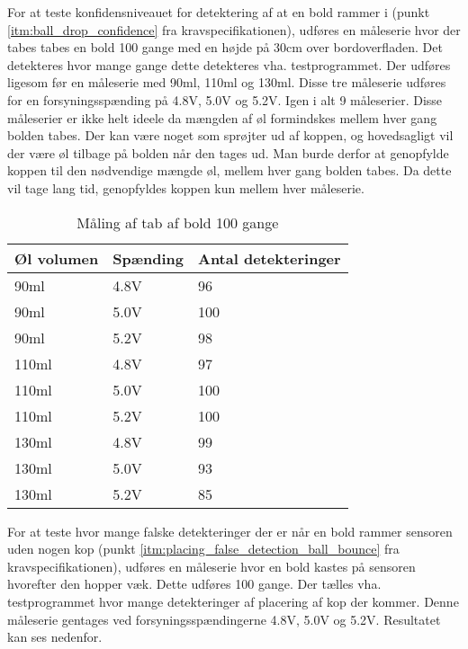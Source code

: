 \documentclass[Modultest/Modultest_main.tex]{subfiles}
\begin{document}
For at teste konfidensniveauet for detektering af at en bold rammer i (punkt \ref{itm:ball_drop_confidence} fra kravspecifikationen), udføres en måleserie hvor der tabes tabes en bold 100 gange med en højde på 30cm over bordoverfladen. Det detekteres hvor mange gange dette detekteres vha. testprogrammet. Der udføres ligesom før en måleserie med 90ml, 110ml og 130ml. Disse tre måleserie udføres for en forsyningsspænding på 4.8V, 5.0V og 5.2V. Igen i alt 9 måleserier. 
Disse måleserier er ikke helt ideele da mængden af øl formindskes mellem hver gang bolden tabes. Der kan være noget som sprøjter ud af koppen, og hovedsagligt vil der være øl tilbage på bolden når den tages ud. Man burde derfor at genopfylde koppen til den nødvendige mængde øl, mellem hver gang bolden tabes. Da dette vil tage lang tid, genopfyldes koppen kun mellem hver måleserie.
\begin{table}[H]
    \centering
    \begin{tabular}{|L{0.15\textwidth}|L{0.15\textwidth}|L{0.2\textwidth}|}
         \hline
         \textbf{Øl volumen} & \textbf{Spænding} & \textbf{Antal detekteringer} \\ \hline
         90ml & 4.8V & 96 \\ \hline 
         90ml & 5.0V & 100 \\ \hline 
         90ml & 5.2V & 98 \\ \hline
         110ml & 4.8V & 97\\ \hline 
         110ml & 5.0V & 100 \\ \hline 
         110ml & 5.2V & 100\\ \hline
         130ml & 4.8V & 99\\ \hline 
         130ml & 5.0V & 93\\ \hline 
         130ml & 5.2V & 85\\ \hline
    \end{tabular}
    \caption{Måling af tab af bold 100 gange}
     \label{tab:100_hit_cup}
\end{table}

For at teste hvor mange falske detekteringer der er når en bold rammer sensoren uden nogen kop (punkt \ref{itm:placing_false_detection_ball_bounce} fra kravspecifikationen), udføres en måleserie hvor en bold kastes på sensoren hvorefter den hopper væk. Dette udføres 100 gange. Der tælles vha. testprogrammet hvor mange detekteringer af placering af kop der kommer.  Denne måleserie gentages ved forsyningsspændingerne 4.8V, 5.0V og 5.2V. Resultatet kan ses nedenfor.
\end{document}
